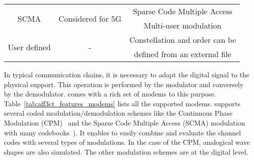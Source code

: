 \begin{table}[htp]
\begin{tabular}{ c | c | c }
  \hline
  \multirow{2}{*}{{SCMA}}         & \multirow{2}{*}{Considered for 5G} & Sparse Code Multiple Access            \\
                                  &                                    & Multi-user modulation                  \\
  \hline
  \multirow{2}{*}{{User defined}} & \multirow{2}{*}{-}                 & Constellation and order can be         \\
                                  &                                    & defined from an external file          \\
  \end{tabular}
\end{table}

In typical communication chains, it is necessary to adapt the digital signal
to the physical support. This operation is performed by the modulator and
conversely by the demodulator. \AFFECT comes with a rich set of modems to this
purpose. Table~\ref{tab:aff3ct_features_modems} lists all the supported modems.
\AFFECT supports several coded modulation/demodulation schemes like the
Continuous Phase Modulation (CPM)~\cite{Aulin1981a,Aulin1981b} and the Sparse
Code Multiple Access (SCMA) modulation~\cite{Nikopour2013,Ghaffari2017,
Ghaffari2019} with many codebooks~\cite{AlteraSCMA,Wu2015,Cheng2015,Zhang2016,
Klimentyev2016,Song2017,Klimentyev2017}). It enables to easily combine and
evaluate the channel codes with several types of modulations. In the case of the
CPM, analogical wave shapes are also simulated. The other modulation schemes are
at the digital level.

